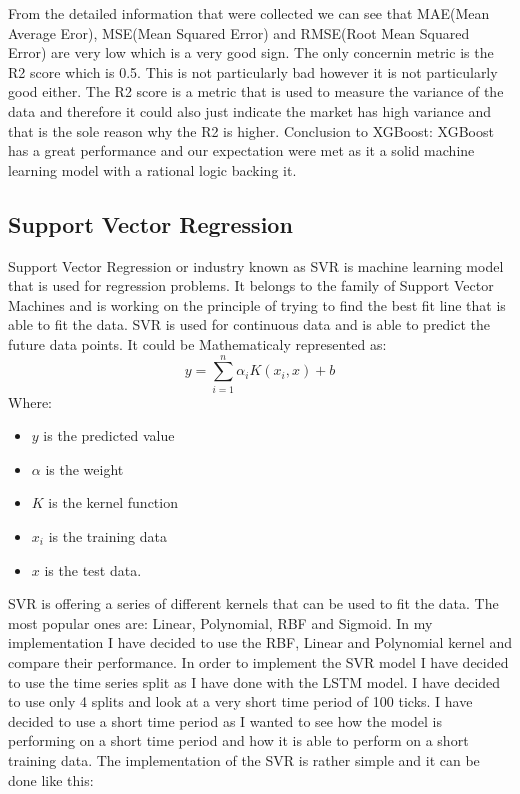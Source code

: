 \documentclass{imc-inf}
\begin{document}
			From the detailed information that were collected we can see that MAE(Mean Average Eror), MSE(Mean Squared Error) and RMSE(Root Mean Squared Error) are very low which is a very good sign. The only concernin metric is the R2 score which is 0.5.
			This is not particularly bad however it is not particularly good either. The R2 score is a metric that is used to measure the variance of the data and therefore it could also just indicate the market has high variance and that is the 
			sole reason why the R2 is higher. Conclusion to XGBoost: XGBoost has a great performance and our expectation were met as it a solid machine learning model with a rational logic backing it.
		\subsection{Support Vector Regression}
			Support Vector Regression or industry known as SVR is machine learning model that is used for regression problems. It belongs to the family of Support Vector Machines and is working on the 
			principle of trying to find the best fit line that is able to fit the data. SVR is used for continuous data and is able to predict the future data points. It could be Mathematicaly represented as:
			\begin{equation}
				y = \sum_{i=1}^{n} \alpha_i K(x_i,x) + b
			\end{equation}
			Where:
			\begin{itemize}
				\item $y$ is the predicted value
				\item  $\alpha$ is the weight 
				\item  $K$ is the kernel function
				\item  $x_i$ is the training data
				\item  $x$ is the test data.

			\end{itemize}
			SVR is offering a series of different kernels that can be used to fit the data. The most popular ones are: Linear, Polynomial, RBF and Sigmoid.
			In my implementation I have decided to use the RBF, Linear and Polynomial kernel and compare their performance. In order to implement the SVR model I have decided to use the time series split as I have done with the LSTM model.
			I have decided to use only 4 splits and look at a very short time period of 100 ticks. I have decided to use a short time period as I wanted to see how the model is performing on a short time period and how it is able to perform 
			on a short training data. The implementation of the SVR is rather simple and it can be done like this:
\end{document}
